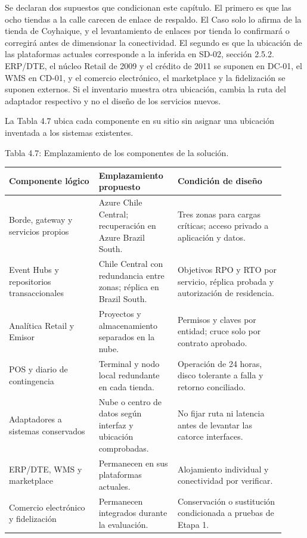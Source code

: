 \documentclass[11pt]{article}
\begin{document}
Se declaran dos supuestos que condicionan este capítulo. El primero es que las ocho tiendas a la calle carecen de enlace de respaldo. El Caso solo lo afirma de la tienda de Coyhaique, y el levantamiento de enlaces por tienda lo confirmará o corregirá antes de dimensionar la conectividad. El segundo es que la ubicación de las plataformas actuales corresponde a la inferida en SD-02, sección 2.5.2. ERP/DTE, el núcleo Retail de 2009 y el crédito de 2011 se suponen en DC-01, el WMS en CD-01, y el comercio electrónico, el marketplace y la fidelización se suponen externos. Si el inventario muestra otra ubicación, cambia la ruta del adaptador respectivo y no el diseño de los servicios nuevos.

La Tabla 4.7 ubica cada componente en su sitio sin asignar una ubicación inventada a los sistemas existentes.

\par\vspace{0pt plus 10\baselineskip}\vspace{0pt plus -10\baselineskip}

Tabla 4.7: Emplazamiento de los componentes de la solución.\par\nopagebreak
\begin{longtable}{@{}p{0.30\linewidth}p{0.26\linewidth}p{0.36\linewidth}@{}}
\toprule Componente lógico & Emplazamiento propuesto & Condición de diseño \\
\midrule\endhead\bottomrule\endlastfoot
Borde, gateway y servicios propios & Azure Chile Central; recuperación en Azure Brazil South. & Tres zonas para cargas críticas; acceso privado a aplicación y datos. \\
Event Hubs y repositorios transaccionales & Chile Central con redundancia entre zonas; réplica en Brazil South. & Objetivos RPO y RTO por servicio, réplica probada y autorización de residencia. \\
Analítica Retail y Emisor & Proyectos y almacenamiento separados en la nube. & Permisos y claves por entidad; cruce solo por contrato aprobado. \\
POS y diario de contingencia & Terminal y nodo local redundante en cada tienda. & Operación de 24 horas, disco tolerante a falla y retorno conciliado. \\
Adaptadores a sistemas conservados & Nube o centro de datos según interfaz y ubicación comprobadas. & No fijar ruta ni latencia antes de levantar las catorce interfaces. \\
ERP/DTE, WMS y marketplace & Permanecen en sus plataformas actuales. & Alojamiento individual y conectividad por verificar. \\
Comercio electrónico y fidelización & Permanecen integrados durante la evaluación. & Conservación o sustitución condicionada a pruebas de Etapa 1. \\
\end{longtable}
\end{document}
